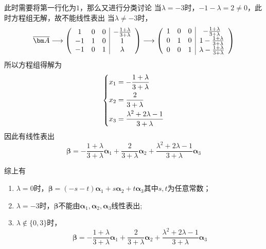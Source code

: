 \begin{solution}
\begin{enumerate}[(1)]
\[              \]
              此时需要将第一行化为$1$，那么又进行分类讨论
              \subitem 当$\lambda=-3$时，$-1-\lambda=2\neq 0$，此时方程组无解，故不能线性表出
              \subitem 当$\lambda\neq-3$时，
              \[
                  \overline{\mat{A}}
                  \longrightarrow
                  \left(\begin{array}{ccc|c}
                          1  & 0 & 0 & -\frac{1+\lambda}{3+\lambda} \\
                          -1 & 1 & 0 & 1                            \\
                          -1 & 0 & 1 & \lambda
                      \end{array}\right)
                  \longrightarrow
                  \left(\begin{array}{ccc|c}
                          1 & 0 & 0 & -\frac{1+\lambda}{3+\lambda}         \\
                          0 & 1 & 0 & 1 -\frac{1+\lambda}{3+\lambda}       \\
                          0 & 0 & 1 & \lambda -\frac{1+\lambda}{3+\lambda}
                      \end{array}\right)
              \]
              所以方程组得解为
              \[
                  \begin{dcases}
                      x_1 = -\frac{1+\lambda}{3+\lambda} \\
                      x_2 = \frac{2}{3+\lambda}          \\
                      x_3 = \frac{\lambda^2+2\lambda-1}{3+\lambda}
                  \end{dcases}
              \]
              因此有线性表出
              \[\bm{\beta} = -\frac{1+\lambda}{3+\lambda}\bm{\alpha}_1 + \frac{2}{3+\lambda}\bm{\alpha}_2 + \frac{\lambda^2+2\lambda-1}{3+\lambda}\bm{\alpha}_3 \]
    \end{enumerate}
    综上有
    \begin{enumerate}[(1)]
        \item $\lambda=0$时，$\bm{\beta} = (-s-t)\bm{\alpha}_1+s\bm{\alpha}_2+t\bm{\alpha}_3$其中$s,t$为任意常数；
        \item $\lambda=-3$时，$\bm{\beta}$不能由$\bm{\alpha}_1,\bm{\alpha}_2,\bm{\alpha}_3$线性表出;
        \item $\lambda\notin\{0,3\}$时，
              \[ \bm{\beta} = -\frac{1+\lambda}{3+\lambda}\bm{\alpha}_1 + \frac{2}{3+\lambda}\bm{\alpha}_2 + \frac{\lambda^2+2\lambda-1}{3+\lambda}\bm{\alpha}_3 \]
    \end{enumerate}
\end{solution}

